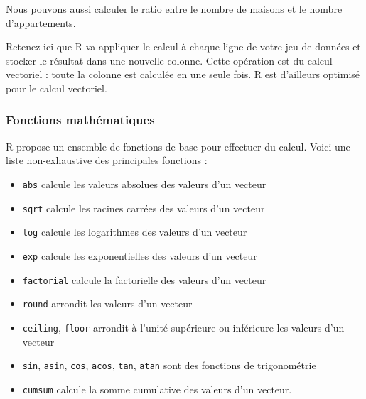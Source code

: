\documentclass[
  11pt,
  french,
]{book}
\makeatletter
\newenvironment{Shaded}{\begin{snugshade}}{\end{snugshade}}
\newcommand{\CommentTok}[1]{\textcolor[rgb]{0.56,0.35,0.01}{\textit{#1}}}
\newcommand{\NormalTok}[1]{#1}
\newcommand{\OperatorTok}[1]{\textcolor[rgb]{0.81,0.36,0.00}{\textbf{#1}}}
\newcommand{\StringTok}[1]{\textcolor[rgb]{0.31,0.60,0.02}{#1}}
\providecommand{\tightlist}{%
  \setlength{\itemsep}{0pt}\setlength{\parskip}{0pt}}
\newenvironment{kframe}{%
\medskip{}
\setlength{\fboxsep}{.8em}
 \def\at@end@of@kframe{}%
 \ifinner\ifhmode%
  \def\at@end@of@kframe{\end{minipage}}%
  \begin{minipage}{\columnwidth}%
 \fi\fi%
 \def\FrameCommand##1{\hskip\@totalleftmargin \hskip-\fboxsep
 \colorbox{shadecolor}{##1}\hskip-\fboxsep
     \hskip-\linewidth \hskip-\@totalleftmargin \hskip\columnwidth}%
 \MakeFramed {\advance\hsize-\width
   \@totalleftmargin\z@ \linewidth\hsize
   \@setminipage}}%
 {\par\unskip\endMakeFramed%
 \at@end@of@kframe}
\renewenvironment{Shaded}{\begin{kframe}}{\end{kframe}}
\makeatother
\begin{document}
Nous pouvons aussi calculer le ratio entre le nombre de maisons et le nombre d'appartements.

\begin{Shaded}
\end{Shaded}

Retenez ici que R va appliquer le calcul à chaque ligne de votre jeu de données et stocker le résultat dans une nouvelle colonne. Cette opération est du calcul vectoriel : toute la colonne est calculée en une seule fois. R est d'ailleurs optimisé pour le calcul vectoriel.

\hypertarget{sect01424}{%
\subsubsection{Fonctions mathématiques}\label{sect01424}}

R propose un ensemble de fonctions de base pour effectuer du calcul. Voici une liste non-exhaustive des principales fonctions :

\begin{itemize}
\tightlist
\item
  \texttt{abs} calcule les valeurs absolues des valeurs d'un vecteur
\item
  \texttt{sqrt} calcule les racines carrées des valeurs d'un vecteur
\item
  \texttt{log} calcule les logarithmes des valeurs d'un vecteur
\item
  \texttt{exp} calcule les exponentielles des valeurs d'un vecteur
\item
  \texttt{factorial} calcule la factorielle des valeurs d'un vecteur
\item
  \texttt{round} arrondit les valeurs d'un vecteur
\item
  \texttt{ceiling}, \texttt{floor} arrondit à l'unité supérieure ou inférieure les valeurs d'un vecteur
\item
  \texttt{sin}, \texttt{asin}, \texttt{cos}, \texttt{acos}, \texttt{tan}, \texttt{atan} sont des fonctions de trigonométrie
\item
  \texttt{cumsum} calcule la somme cumulative des valeurs d'un vecteur.
\end{itemize}
\end{document}
